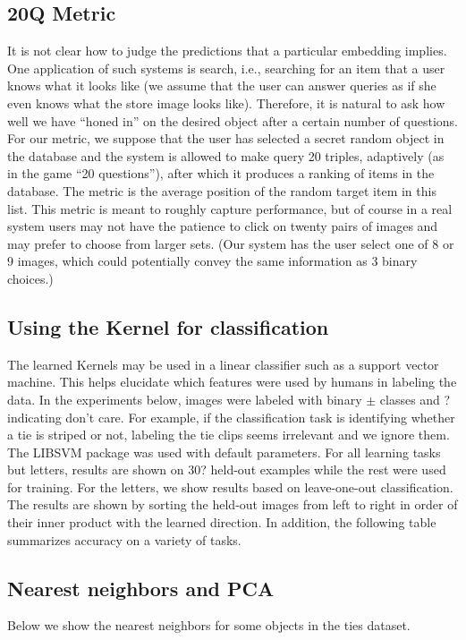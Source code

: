 \documentclass{article}
\begin{document}
\subsection{20Q Metric}
It is not clear how to judge the predictions that a particular embedding implies.  One application of such systems is search, i.e., searching for an item that a user knows what it looks like (we assume that the user can answer queries as if she even knows what the store image looks like).  Therefore, it is natural to ask how well we have ``honed in'' on the desired object after a certain number of questions.  For our metric, we suppose that the user has selected a secret random object in the database and the system is allowed to make query 20 triples, adaptively (as in the game ``20 questions''), after which it produces a ranking of items in the database.  The metric is the average position of the random target item in this list.  This metric is meant to roughly capture performance, but of course in a real system users may not have the patience to click on twenty pairs of images and may prefer to choose from larger sets. (Our system has the user select one of 8 or 9 images, which could potentially convey the same information as 3 binary choices.)

\subsection{Using the Kernel for classification}

The learned Kernels may be used in a linear classifier such as a
support vector machine.  This helps elucidate which features were used
by humans in labeling the data.  In the experiments below, images were
labeled with binary $\pm$ classes and ? indicating don't care.  For
example, if the classification task is identifying whether a tie is
striped or not, labeling the tie clips seems irrelevant and we ignore
them.  The LIBSVM \cite{CC01} package was used with default
parameters.  For all learning tasks but letters, results are shown on
30? held-out examples while the rest were used for training.  For the
letters, we show results based on leave-one-out classification.  The
results are shown by sorting the held-out images from left to right in
order of their inner product with the learned direction.  In addition,
the following table summarizes accuracy on a variety of tasks.

\subsection{Nearest neighbors and PCA}
Below we show the nearest neighbors for some objects in the ties dataset.
\end{document}
